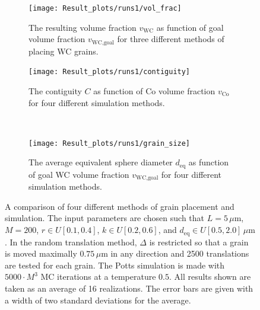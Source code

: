 \documentclass[10pt,a4paper]{article}
\begin{document}
\begin{figure}
	\begin{center}
		\begin{subfigure}[t]{.49\columnwidth}
			\centering
			\texttt{[image: Result\_plots/runs1/vol\_frac]}
			\caption{The resulting volume fraction $v_\text{WC}$ as function of goal volume fraction $v_\text{WC,goal}$ for three different methods of placing WC grains.}
			\label{fig:runs1_vol_frac}
		\end{subfigure}
		\begin{subfigure}[t]{.49\columnwidth}
			\centering
			\texttt{[image: Result\_plots/runs1/contiguity]}
			\caption{The contiguity $C$ as function of Co volume fraction $v_\text{Co}$ for four different simulation methods.}
			\label{fig:runs1_contiguity}
		\end{subfigure}
		\\
		\begin{subfigure}[t]{.49\columnwidth}
			\centering
			\texttt{[image: Result\_plots/runs1/grain\_size]}
			\caption{ The average equivalent sphere diameter $d_\text{eq}$ as function of goal WC volume fraction $v_\text{WC,goal}$ for four different simulation methods.}
			\label{fig:runs1_grain_size}
		\end{subfigure}
		\caption{A comparison of four different methods of grain placement and simulation. The input parameters are chosen such that $L=5 \, \mu\text{m}$, $M=200$, $r \in U[0.1, 0.4]$, $k \in U[0.2, 0.6]$, and $d_\text{eq} \in U[0.5, 2.0] \, \mu\text{m}$. In the random translation method, $\Delta$ is restricted so that a grain is moved maximally $0.75 \, \mu \text{m}$ in any direction and 2500 translations are tested for each grain. The Potts simulation is made with $5000 \cdot M^3$ MC iterations at a temperature $0.5$. All results shown are taken as an average of 16 realizations. The error bars are given with a width of two standard deviations for the average.}
		\label{fig:runs1}
	\end{center}
\end{figure}
\end{document}
